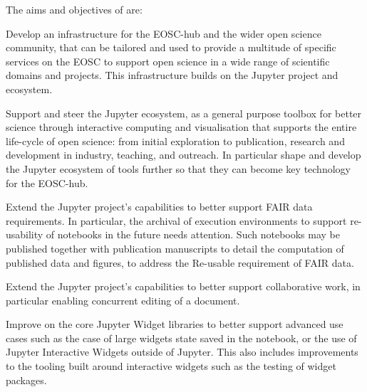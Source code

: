 




\noindent The aims and objectives of \TheProject are:
\begin{compactenum}

\item \label{aim:eosc}%
  Develop an infrastructure for the EOSC-hub and the wider open
  science community, that can be tailored and used to provide a
  multitude of specific services on the EOSC to support open science
  in a wide range of scientific domains and projects. This infrastructure
  builds on the Jupyter project and ecosystem.

\item \label{aim:jupyter}%
  Support and steer the Jupyter ecosystem, as a general purpose
  toolbox for better science through interactive computing and
  visualisation that supports the entire life-cycle of open science:
  from initial exploration to publication, research and development in
  industry, teaching, and outreach. In particular shape and develop
  the Jupyter ecosystem of tools further so that they can become key
  technology for the EOSC-hub.

\item \label{aim:jupyter-reusability}%
  Extend the Jupyter project's capabilities to better support FAIR
  data requirements. In particular, the archival of execution
  environments to support re-usability of notebooks in the future
  needs attention. Such notebooks may be published together with
  publication manuscripts to detail the computation of published data
  and figures, to address the Re-usable requirement of FAIR data.

\item \label{aim:jupyter-collaboration}%
  Extend the Jupyter project's capabilities to better support
  collaborative work, in particular enabling concurrent editing of a
  document.

\item \label{aim:jupyter-widgets}%
  Improve on the core Jupyter Widget libraries to better support advanced
  use cases such as the case of large widgets state saved in the notebook, or
  the use of Jupyter Interactive Widgets outside of Jupyter. This also includes
  improvements to the tooling built around interactive widgets such as the
  testing of widget packages.


\end{compactenum}
